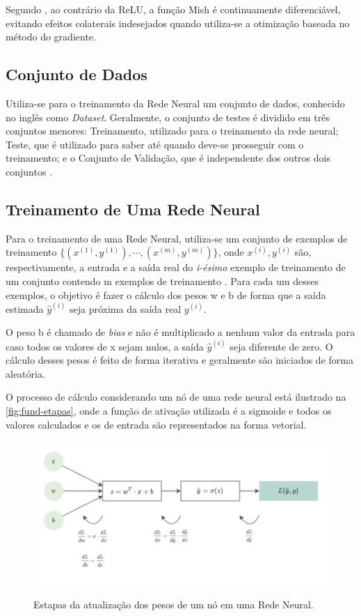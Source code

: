 Segundo , ao contrário da ReLU, a função Mish é continuamente diferenciável, evitando efeitos colaterais indesejados quando utiliza-se a otimização baseada no método do gradiente.

\subsection{Conjunto de Dados} \label{cap:treinamento-dataset}

Utiliza-se para o treinamento da Rede Neural um conjunto de dados, conhecido no inglês como \textit{Dataset}. Geralmente, o conjunto de testes é dividido em três conjuntos menores: Treinamento, utilizado para o treinamento da rede neural; Teste, que é utilizado para saber até quando deve-se prosseguir com o treinamento; e o Conjunto de Validação, que é independente dos outros dois conjuntos \cite{ref:Crowther}.

\subsection{Treinamento de Uma Rede Neural}\label{cap:fund-ia-rn-treinamento}

Para o treinamento de uma Rede Neural, utiliza-se um conjunto de exemplos de treinamento $\{(x^{(1)}, y^{(1)}), \cdots, (x^{(m)}, y^{(m)})\}$, onde $x^{(i)}, y^{(i)}$ são, respectivamente, a entrada e a saída real do \textit{i-ésimo} exemplo de treinamento de um conjunto contendo m exemplos de treinamento \cite{ref:Ng}. Para cada um desses exemplos, o objetivo é fazer o cálculo dos pesos w e b de forma que a saída estimada $\hat{y}^{(i)}$ seja próxima da saída real $y^{(i)}$.

O peso b é chamado de \textit{bias} e não é multiplicado a nenhum valor da entrada para caso todos os valores de x sejam nulos, a saída $\hat{y}^{(i)}$ seja diferente de zero. O cálculo desses pesos é feito de forma iterativa e geralmente são iniciados de forma aleatória.

O processo de cálculo considerando um nó de uma rede neural está ilustrado na \autoref{fig:fund-etapas}, onde a função de ativação utilizada é a sigmoide e todos os valores calculados e os de entrada são representados na forma vetorial.

\begin{figure}[h!] %
  \centering
  \caption{Estapas da atualização dos pesos de um nó em uma Rede Neural.}
  \includegraphics[scale=1.1]{img/img-fundamentacao-etapas.pdf}
  \label{fig:fund-etapas}
\end{figure}


